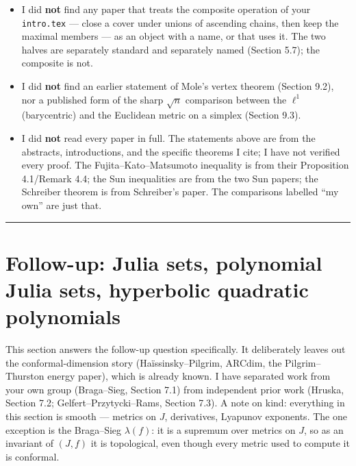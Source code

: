 \documentclass[
]{article}
\begin{document}
\begin{itemize}
  class of Euclidean metrics (Bobok--Roth), or over metrics in a product
  with Hausdorff dimension (Roth--Roth).
\item
  I did \textbf{not} find any paper that treats the composite operation
  of your \texttt{intro.tex} --- close a cover under unions of ascending
  chains, then keep the maximal members --- as an object with a name, or
  that uses it. The two halves are separately standard and separately
  named (Section 5.7); the composite is not.
\item
  I did \textbf{not} find an earlier statement of Mole's vertex theorem
  (Section 9.2), nor a published form of the sharp \(\sqrt n\)
  comparison between the \(\ell^1\) (barycentric) and the Euclidean
  metric on a simplex (Section 9.3).
\item
  I did \textbf{not} read every paper in full. The statements above are
  from the abstracts, introductions, and the specific theorems I cite; I
  have not verified every proof. The Fujita--Kato--Matsumoto inequality
  is from their Proposition 4.1/Remark 4.4; the Sun inequalities are
  from the two Sun papers; the Schreiber theorem is from Schreiber's
  paper. The comparisons labelled ``my own'' are just that.
\end{itemize}

\begin{center}\rule{0.5\linewidth}{0.5pt}\end{center}

\section{Follow-up: Julia sets, polynomial Julia sets, hyperbolic
quadratic
polynomials}\label{follow-up-julia-sets-polynomial-julia-sets-hyperbolic-quadratic-polynomials}

This section answers the follow-up question specifically. It
deliberately leaves out the conformal-dimension story
(Ha\"{i}ssinsky--Pilgrim, ARCdim, the Pilgrim--Thurston energy paper),
which is already known. I have separated work from your own group
(Braga--Sieg, Section 7.1) from independent prior work (Hruska, Section 7.2;
Gelfert--Przytycki--Rams, Section 7.3). A note on kind: everything in this
section is smooth --- metrics on \(J\), derivatives, Lyapunov exponents.
The one exception is the Braga--Sieg \(\lambda(f)\): it is a supremum
over metrics on \(J\), so as an invariant of \((J,f)\) it is
topological, even though every metric used to compute it is conformal.
\end{document}
